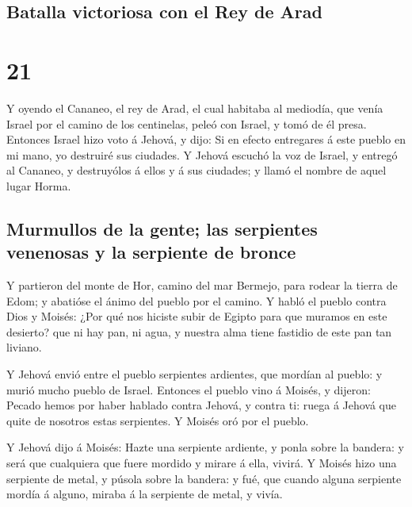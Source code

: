 \hypertarget{batalla-victoriosa-con-el-rey-de-arad}{%
\subsection{Batalla victoriosa con el Rey de
Arad}\label{batalla-victoriosa-con-el-rey-de-arad}}

\hypertarget{section-04-21}{%
\section{21}\label{section-04-21}}

 Y oyendo el Cananeo, el rey de Arad, el cual habitaba al
mediodía, que venía Israel por el camino de los centinelas, peleó con
Israel, y tomó de él presa.  Entonces Israel hizo voto á
Jehová, y dijo: Si en efecto entregares á este pueblo en mi mano, yo
destruiré sus ciudades.  Y Jehová escuchó la voz de
Israel, y entregó al Cananeo, y destruyólos á ellos y á sus ciudades; y
llamó el nombre de aquel lugar Horma.

\hypertarget{murmullos-de-la-gente-las-serpientes-venenosas-y-la-serpiente-de-bronce}{%
\subsection{Murmullos de la gente; las serpientes venenosas y la
serpiente de
bronce}\label{murmullos-de-la-gente-las-serpientes-venenosas-y-la-serpiente-de-bronce}}

 Y partieron del monte de Hor, camino del mar Bermejo,
para rodear la tierra de Edom; y abatióse el ánimo del pueblo por el
camino.  Y habló el pueblo contra Dios y Moisés: ¿Por qué
nos hiciste subir de Egipto para que muramos en este desierto? que ni
hay pan, ni agua, y nuestra alma tiene fastidio de este pan tan liviano.

 Y Jehová envió entre el pueblo serpientes ardientes, que
mordían al pueblo: y murió mucho pueblo de Israel. 
Entonces el pueblo vino á Moisés, y dijeron: Pecado hemos por haber
hablado contra Jehová, y contra ti: ruega á Jehová que quite de nosotros
estas serpientes. Y Moisés oró por el pueblo.

 Y Jehová dijo á Moisés: Hazte una serpiente ardiente, y
ponla sobre la bandera: y será que cualquiera que fuere mordido y mirare
á ella, vivirá.  Y Moisés hizo una serpiente de metal, y
púsola sobre la bandera: y fué, que cuando alguna serpiente mordía á
alguno, miraba á la serpiente de metal, y vivía.

